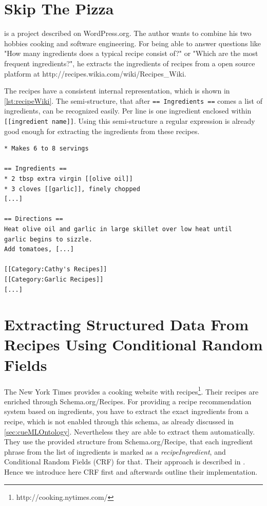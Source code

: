 \documentclass[12pt, twoside]{report}
\begin{document}
\section{Skip The Pizza}
\parencite{REgutGenug} is a project described on WordPress.org. The author wants to combine his two hobbies cooking and software engineering. For being able to answer questions like "How many ingredients does a typical recipe consist of?" or "Which are the most frequent ingredients?", he extracts the ingredients of recipes from a open source platform at http://recipes.wikia.com/wiki/Recipes\_Wiki.

The recipes have a consistent internal representation, which is shown in \cref{lst:recipeWiki}. The semi-structure, that after \texttt{== Ingredients ==} comes a list of ingredients, can be recognized easily. Per line is one ingredient enclosed within \texttt{[[ingredient name]]}. Using this semi-structure a regular expression is already good enough for extracting the ingredients from these recipes.

\begin{lstlisting}[frame=single, basicstyle=\footnotesize\ttfamily,caption={Shortened example recipe from \\ http://recipes.wikia.com/wiki/Recipes\_Wiki}, label=lst:recipeWiki]
* Makes 6 to 8 servings

== Ingredients ==
* 2 tbsp extra virgin [[olive oil]]
* 3 cloves [[garlic]], finely chopped
[...]

== Directions ==
Heat olive oil and garlic in large skillet over low heat until
garlic begins to sizzle.
Add tomatoes, [...]

[[Category:Cathy's Recipes]]
[[Category:Garlic Recipes]]
[...]
\end{lstlisting}


\section{Extracting Structured Data From Recipes Using Conditional Random Fields}\label{sec:crfzeit}
The New York Times provides a cooking website with recipes\footnote{http://cooking.nytimes.com/}. Their recipes are enriched through Schema.org/Recipes. For providing a recipe recommendation system based on ingredients, you have to extract the exact ingredients from a recipe, which is not enabled through this schema, as already discussed in \cref{sec:cueMLOntology}. Nevertheless they are able to extract them automatically. They use the provided structure from Schema.org/Recipe, that each ingredient phrase from the list of ingredients is marked as a \textit{recipeIngredient}, and Conditional Random Fields (CRF) for that. Their approach is described in \parencite{CRFZeit}. Hence we introduce here CRF first and afterwards outline their implementation.  
\end{document}
